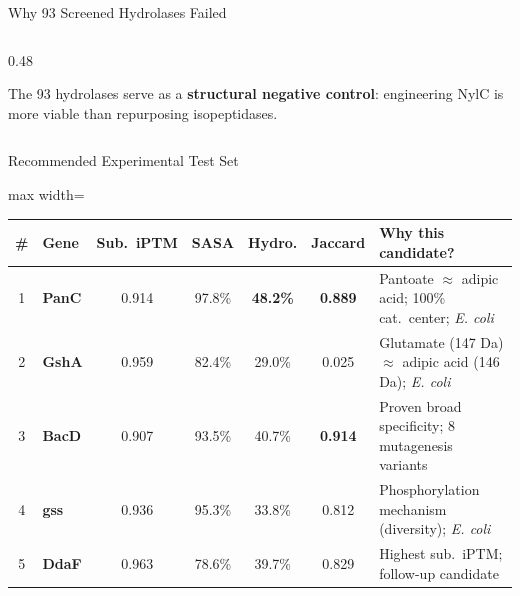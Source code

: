 \documentclass[aspectratio=169, 11pt]{beamer}
\begin{document}
\begin{frame}{Why 93 Screened Hydrolases Failed}
\begin{columns}[T]
\begin{column}{0.48\textwidth}
\vspace{2pt}
\colorbox{lightblue!50}{\parbox{0.92\textwidth}{\centering
\scriptsize The 93 hydrolases serve as a \textbf{structural negative control}: engineering NylC is more viable than repurposing isopeptidases.
}}

\end{column}
\end{columns}
\end{frame}

\begin{frame}{Recommended Experimental Test Set}
\vspace{-6pt}

\begin{center}
\begin{adjustbox}{max width=\textwidth}
\small
\begin{tabular}{clccccl}
\toprule
\textbf{\#} & \textbf{Gene} & \textbf{Sub.\ iPTM} & \textbf{SASA} & \textbf{Hydro.} & \textbf{Jaccard} & \textbf{Why this candidate?} \\
\midrule
1 & \textbf{PanC} & 0.914 & 97.8\% & \textbf{48.2\%} & \textbf{0.889} & Pantoate $\approx$ adipic acid; 100\% cat.\ center; \textit{E. coli} \\
2 & \textbf{GshA} & 0.959 & 82.4\% & 29.0\% & \textcolor{accentred}{0.025} & Glutamate (147 Da) $\approx$ adipic acid (146 Da); \textit{E. coli} \\
3 & \textbf{BacD} & 0.907 & 93.5\% & 40.7\% & \textbf{0.914} & Proven broad specificity; 8 mutagenesis variants \\
4 & \textbf{gss} & 0.936 & 95.3\% & 33.8\% & 0.812 & Phosphorylation mechanism (diversity); \textit{E. coli} \\
5 & \textbf{DdaF} & 0.963 & 78.6\% & 39.7\% & 0.829 & Highest sub.\ iPTM; follow-up candidate \\
\bottomrule
\end{tabular}
\end{adjustbox}
\end{center}


\end{frame}
\end{document}

